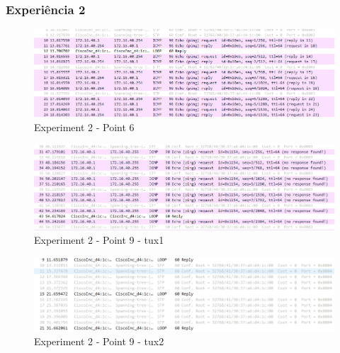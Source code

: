 \documentclass[a4paper]{article}
\begin{document}
	\subsubsection{Experiência 2}
	
	\begin{figure}[H]
	\begin{center}
  	\includegraphics[width=\linewidth]{exp2_6_t2.png}
  	\caption{Experiment 2 - Point 6}
  	\label{fig:Experiment 2 - Point 6}
	\end{center}
	\end{figure}

	\begin{figure}[H]
	\begin{center}
  	\includegraphics[width=\linewidth]{exp2_9_tux1.png}
  	\caption{Experiment 2 - Point 9 - tux1}
  	\label{fig:Experiment 2 - Point 9 - tux1}
	\end{center}
	\end{figure}

	\begin{figure}[H]
	\begin{center}
  	\includegraphics[width=\linewidth]{exp2_9_tux2.png}
  	\caption{Experiment 2 - Point 9 - tux2}
  	\label{fig:Experiment 2 - Point 9 - tux2}
	\end{center}
	\end{figure}
\end{document}
